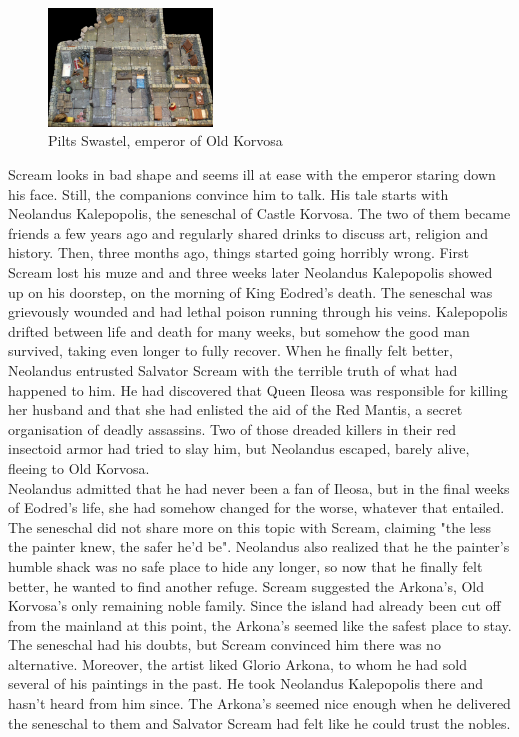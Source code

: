 \begin{figure}[h]
	\centering
	\includegraphics[width=0.39\textwidth]{images/Pilts-Swastel-emperor-of-Old-Korvosa-562541723.jpg}
	\caption{Pilts Swastel, emperor of Old Korvosa}
	\label{fig:Pilts-Swastel-emperor-of-Old-Korvosa-562541723}
\end{figure}

Scream looks in bad shape and seems ill at ease with the emperor staring down his face. Still, the companions convince him to talk. His tale starts with Neolandus Kalepopolis, the seneschal of Castle Korvosa. The two of them became friends a few years ago and regularly shared drinks to discuss art, religion and history. Then, three months ago, things started going horribly wrong. First Scream lost his muze and and three weeks later Neolandus Kalepopolis showed up on his doorstep, on the morning of King Eodred's death. The seneschal was grievously wounded and had lethal poison running through his veins. Kalepopolis drifted between life and death for many weeks, but somehow the good man survived, taking even longer to fully recover. When he finally felt better, Neolandus entrusted Salvator Scream with the terrible truth of what had happened to him. He had discovered that Queen Ileosa was responsible for killing her husband and that she had enlisted the aid of the Red Mantis, a secret organisation of deadly assassins. Two of those dreaded killers in their red insectoid armor had tried to slay him, but Neolandus escaped, barely alive, fleeing to Old Korvosa.\\

Neolandus admitted that he had never been a fan of Ileosa, but in the final weeks of Eodred's life, she had somehow changed for the worse, whatever that entailed. The seneschal did not share more on this topic with Scream, claiming "the less the painter knew, the safer he'd be". Neolandus also realized that he the painter's humble shack was no safe place to hide any longer, so now that he finally felt better, he wanted to find another refuge. Scream suggested the Arkona's, Old Korvosa's only remaining noble family. Since the island had already been cut off from the mainland at this point, the Arkona's seemed like the safest place to stay. The seneschal had his doubts, but Scream convinced him there was no alternative. Moreover, the artist liked Glorio Arkona, to whom he had sold several of his paintings in the past. He took Neolandus Kalepopolis there and hasn't heard from him since. The Arkona's seemed nice enough when he delivered the seneschal to them and Salvator Scream had felt like he could trust the nobles.\\

